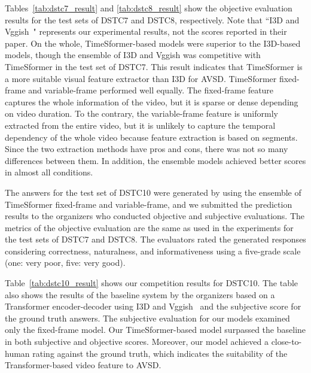 \documentclass[letterpaper]{article} %
\begin{document}
Tables~\ref{tab:dstc7_result} and \ref{tab:dstc8_result} show the objective evaluation results for the test sets of DSTC7 and DSTC8, respectively.
Note that ``I3D and Vggish~\cite{Li2021bridging}" represents our experimental results, not the scores reported in their paper.
On the whole, TimeSformer-based models were superior to the I3D-based models, though the ensemble of I3D and Vggish was competitive with TimeSformer in the test set of DSTC7. 
This result indicates that TimeSformer is a more suitable visual feature extractor than I3D for AVSD.
TimeSformer fixed-frame and variable-frame performed well equally.
The fixed-frame feature captures the whole information of the video, but it is sparse or dense depending on video duration.
To the contrary, the variable-frame feature is uniformly extracted from the entire video, but it is unlikely to capture the temporal dependency of the whole video because feature extraction is based on segments.
Since the two extraction methods have pros and cons, there was not so many differences between them.
% 
In addition, the ensemble models achieved better scores in almost all conditions.

The answers for the test set of DSTC10 were generated by using the ensemble of TimeSformer fixed-frame and variable-frame, and we submitted the prediction results to the organizers
% 
who conducted objective and subjective evaluations.
The metrics of the objective evaluation are the same as used in the experiments for the test sets of DSTC7 and DSTC8.
The evaluators rated the generated responses considering correctness, naturalness, and informativeness using a five-grade scale (one: very poor, five: very good).

Table~\ref{tab:dstc10_result} shows our competition results for DSTC10.
The table also shows the results of the baseline system by the organizers based on a Transformer encoder-decoder using I3D and Vggish~\cite{Shah2021audio} and the subjective score for the ground truth answers.
The subjective evaluation for our models examined only the fixed-frame model.
% 
Our TimeSformer-based model surpassed the baseline in both subjective and objective scores.
Moreover, our model achieved a close-to-human rating against the ground truth, which indicates the suitability of the Transformer-based video feature to AVSD.
\end{document}
